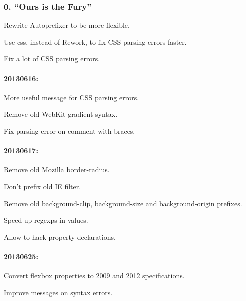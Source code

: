 \subsubsection*{0. “\+Ours is the Fury”}


\begin{DoxyItemize}
\item Rewrite Autoprefixer to be more flexible.
\item Use css, instead of Rework, to fix C\+SS parsing errors faster.
\item Fix a lot of C\+SS parsing errors.
\end{DoxyItemize}

\paragraph*{20130616\+:}


\begin{DoxyItemize}
\item More useful message for C\+SS parsing errors.
\item Remove old Web\+Kit gradient syntax.
\item Fix parsing error on comment with braces.
\end{DoxyItemize}

\paragraph*{20130617\+:}


\begin{DoxyItemize}
\item Remove old Mozilla border-\/radius.
\item Don’t prefix old IE filter.
\item Remove old background-\/clip, background-\/size and background-\/origin prefixes.
\item Speed up regexps in values.
\item Allow to hack property declarations.
\end{DoxyItemize}

\paragraph*{20130625\+:}


\begin{DoxyItemize}
\item Convert flexbox properties to 2009 and 2012 specifications.
\item Improve messages on syntax errors.
\end{DoxyItemize}

